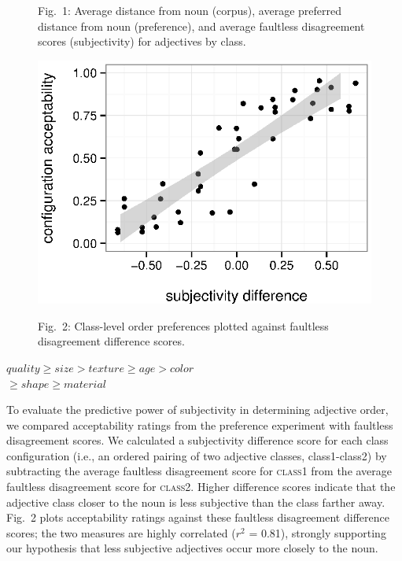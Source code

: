 \documentclass[12pt]{article}
\begin{document}
\begin{figure}
\begin{center}
	\end{center}
	\vspace{-15pt}
	Fig.~1: Average distance from noun (corpus), average preferred distance from noun  (preference), and average faultless disagreement scores (subjectivity) for adjectives by class.
	\vspace{-12pt}
	\begin{center}
		\includegraphics[width=.85\linewidth]{plots/comparison2.eps}
	\end{center}
	\vspace{-10pt}
	Fig.~2: Class-level order preferences plotted against faultless disagreement difference scores.
\end{figure}
\vspace{0pt}
\vspace{-13pt}
\begin{center}
	\vspace{-14pt}
	$quality \geq size > texture \geq age > color$\\
	$\geq shape \geq material$
\end{center}
\vspace{-11pt}

\noindent
To evaluate the predictive power of subjectivity in determining adjective order, we compared acceptability ratings from the preference experiment with faultless disagreement scores. We  calculated a subjectivity difference score for each class configuration (i.e., an ordered pairing of two adjective classes, class1-class2) by subtracting the average faultless disagreement score for \textsc{class1} from the average faultless disagreement score for \textsc{class2}. Higher difference scores indicate that the adjective class closer to the noun is less subjective than the class farther away. Fig.~2 plots acceptability ratings  against these faultless disagreement difference scores; the two measures are highly correlated ($r^2$ = 0.81), strongly supporting our hypothesis that less subjective adjectives occur more closely to the noun.
\end{document}
